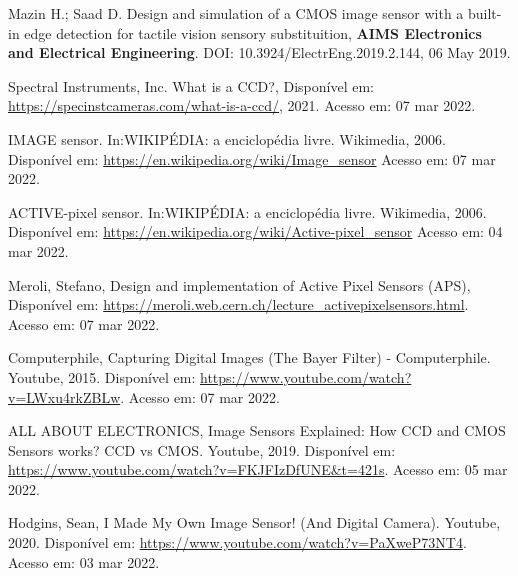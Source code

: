 \documentclass[11pt,a4paper,twocolumn]{article}
\begin{document}
	\begin{thebibliography}{99}
		{Mazin H.; Saad D. {Design and simulation of a CMOS image sensor with a built-in edge detection for tactile vision sensory substituition}, \textbf{AIMS Electronics and Electrical Engineering}. DOI: 10.3924/ElectrEng.2019.2.144, 06 May 2019.}
		
		{Spectral Instruments, Inc. {What is a CCD?}, Disponível em: \url{https://specinstcameras.com/what-is-a-ccd/}, 2021. Acesso em: 07 mar 2022.}
		
		{IMAGE sensor. In:WIKIPÉDIA: a enciclopédia livre. Wikimedia, 2006. Disponível em: \url{https://en.wikipedia.org/wiki/Image_sensor} Acesso em: 07 mar 2022.}

		{ACTIVE-pixel sensor. In:WIKIPÉDIA: a enciclopédia livre. Wikimedia, 2006. Disponível em: \url{https://en.wikipedia.org/wiki/Active-pixel_sensor} Acesso em: 04 mar 2022.}
		
		{Meroli, Stefano, {Design and implementation of Active Pixel Sensors (APS)}, Disponível em: \url{https://meroli.web.cern.ch/lecture_activepixelsensors.html}. Acesso em: 07 mar 2022.}
		
		{Computerphile, {Capturing Digital Images (The Bayer Filter) - Computerphile}. Youtube, 2015. Disponível em: \url{https://www.youtube.com/watch?v=LWxu4rkZBLw}. Acesso em: 07 mar 2022.}
		
		{ALL ABOUT ELECTRONICS, {Image Sensors Explained: How CCD and CMOS Sensors works? CCD vs CMOS}. Youtube, 2019. Disponível em: \url{https://www.youtube.com/watch?v=FKJFIzDfUNE&t=421s}. Acesso em: 05 mar 2022.}
		
		{Hodgins, Sean, {I Made My Own Image Sensor! (And Digital Camera)}. Youtube, 2020. Disponível em: \url{https://www.youtube.com/watch?v=PaXweP73NT4}. Acesso em: 03 mar 2022.}

	\end{thebibliography}
\end{document}
